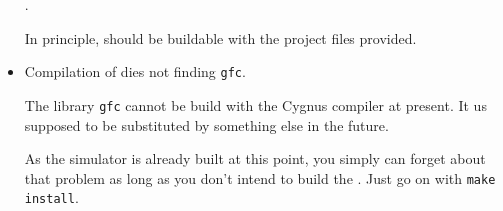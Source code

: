 \begin{itemize}
 .

In principle, \FlightGear should be buildable with the project files provided.

\item{Compilation of \FlightGear dies not finding \texttt{gfc}}.

The library \texttt{gfc} cannot be build with the Cygnus compiler at present. It us
supposed to be substituted by something else in the future.

As the simulator is already built at this point, you simply can forget about that problem
as long as you don't intend to build the . Just go on with
\texttt{make install}.

\end{itemize}


